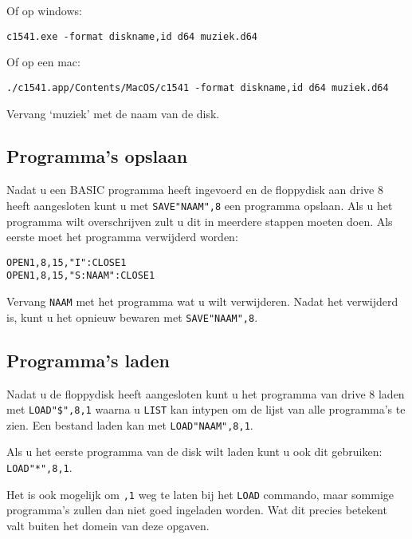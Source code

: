 Of op windows:

\begin{lstlisting}
c1541.exe -format diskname,id d64 muziek.d64
\end{lstlisting}

Of op een mac:

\begin{lstlisting}
./c1541.app/Contents/MacOS/c1541 -format diskname,id d64 muziek.d64
\end{lstlisting}

Vervang `muziek' met de naam van de disk.

\subsection{Programma's opslaan}

Nadat u een BASIC programma heeft ingevoerd en de floppydisk aan drive 8 heeft aangesloten kunt u met \verb:SAVE"NAAM",8: een programma opslaan.
Als u het programma wilt overschrijven zult u dit in meerdere stappen moeten doen.
Als eerste moet het programma verwijderd worden:

\begin{lstlisting}
OPEN1,8,15,"I":CLOSE1
OPEN1,8,15,"S:NAAM":CLOSE1
\end{lstlisting}

Vervang \verb:NAAM: met het programma wat u wilt verwijderen.
Nadat het verwijderd is, kunt u het opnieuw bewaren met \verb:SAVE"NAAM",8:.

\subsection{Programma's laden}

Nadat u de floppydisk heeft aangesloten kunt u het programma van drive 8 laden met \verb:LOAD"$",8,1: waarna u \verb:LIST: kan intypen om de lijst van alle programma's te zien.
Een bestand laden kan met \verb:LOAD"NAAM",8,1:.

Als u het eerste programma van de disk wilt laden kunt u ook dit gebruiken: \verb:LOAD"*",8,1:.

Het is ook mogelijk om \verb:,1: weg te laten bij het \verb:LOAD: commando, maar sommige programma's zullen dan niet goed ingeladen worden.
Wat dit precies betekent valt buiten het domein van deze opgaven.
